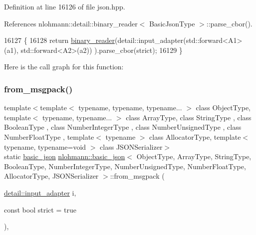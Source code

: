 Definition at line 16126 of file json.\+hpp.



References nlohmann\+::detail\+::binary\+\_\+reader$<$ Basic\+Json\+Type $>$\+::parse\+\_\+cbor().


\begin{DoxyCode}
16127     \{
16128         \textcolor{keywordflow}{return} \hyperlink{classnlohmann_1_1basic__json_a7e06ed27ff517575ccb23fc23fca2b8f}{binary\_reader}(detail::input\_adapter(std::forward<A1>(a1), std::forward<A2>(a2))
      ).parse\_cbor(strict);
16129     \}
\end{DoxyCode}
Here is the call graph for this function\+:
\mbox{\label{classnlohmann_1_1basic__json_aab804530006701b136ef9a0bc961434b}} 
\subsubsection{\texorpdfstring{from\+\_\+msgpack()}{from\_msgpack()}\hspace{0.1cm}{\footnotesize\ttfamily [1/2]}}
{\footnotesize\ttfamily template$<$template$<$ typename, typename, typename... $>$ class Object\+Type, template$<$ typename, typename... $>$ class Array\+Type, class String\+Type , class Boolean\+Type , class Number\+Integer\+Type , class Number\+Unsigned\+Type , class Number\+Float\+Type , template$<$ typename $>$ class Allocator\+Type, template$<$ typename, typename=void $>$ class J\+S\+O\+N\+Serializer$>$ \\
static \hyperlink{classnlohmann_1_1basic__json}{basic\+\_\+json} \hyperlink{classnlohmann_1_1basic__json}{nlohmann\+::basic\+\_\+json}$<$ Object\+Type, Array\+Type, String\+Type, Boolean\+Type, Number\+Integer\+Type, Number\+Unsigned\+Type, Number\+Float\+Type, Allocator\+Type, J\+S\+O\+N\+Serializer $>$\+::from\+\_\+msgpack (\begin{DoxyParamCaption}\item[{\hyperlink{classnlohmann_1_1detail_1_1input__adapter}{detail\+::input\+\_\+adapter}}]{i,  }\item[{const bool}]{strict = {\ttfamily true} }\end{DoxyParamCaption})\hspace{0.3cm}{\ttfamily [inline]}, {\ttfamily [static]}}



